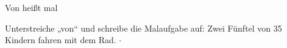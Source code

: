 \setcounter{aufgabe}{17}

\begin{aufgabe}{Von heißt mal}
\begin{teile}
\teil Unterstreiche „von“ und schreibe die Malaufgabe auf: Zwei Fünftel von 35 Kindern fahren mit dem Rad. \leerfeld $\cdot$ \leerfeld
\end{teile}
\end{aufgabe}

